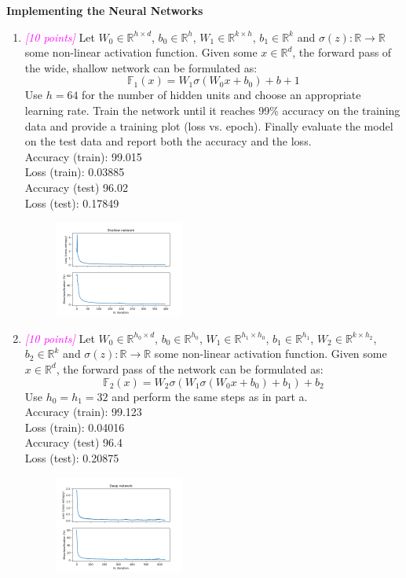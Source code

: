 \documentclass{article}
\newcommand{\field}[1]{\mathbb{#1}}
\newcommand{\1}{\mathbf{1}}
\newcommand{\R}{\field{R}} %
\newcommand{\F}{\field{F}} %
\newcommand{\points}[1]{\small\textcolor{magenta}{\emph{[#1 points]}} \normalsize}
\begin{document}
\textbf{Implementing the Neural Networks}
\begin{enumerate}
    \item \points{10} Let $W_0\in\R^{h\times d}$, $b_0\in\R^h$, $W_1\in\R^{k\times h}$, $b_1\in\R^k$ and $\sigma (z): \R \rightarrow \R$ some non-linear activation function. Given some $x\in\R^d$, the forward pass of the wide, shallow network can be formulated as:
    $$\F_1(x) = W_1\sigma (W_0x+b_0) + b+1$$
    Use $h=64$ for the number of hidden units and choose an appropriate learning rate. Train the network until it reaches 99\% accuracy on the training data and provide a training plot (loss vs. epoch). Finally evaluate the model on the test data and report both the accuracy and the loss. \\
    Accuracy (train): 99.015 \\
    Loss (train): 0.03885 \\
    Accuracy (test) 96.02 \\
    Loss (test): 0.17849 \\
    \begin{figure}[h!]
    \centering 
    \includegraphics[width=0.4\textwidth]{HW3/HW3_plots/A5a_ShallowNet.png}
    \end{figure}
    
    \newpage
    \item \points{10} Let $W_0\in\R^{h_0\times d}$, $b_0\in\R^{h_0}$, $W_1\in\R^{h_1\times h_0}$, $b_1 \in \R^{h_1}$, $W_2\in \R^{k\times h_2}$, $b_2 \in \R^k$ and $\sigma (z): \R \rightarrow \R$ some non-linear activation function. Given some $x\in\R^d$, the forward pass of the network can be formulated as:
    $$\F_2(x) = W_2\sigma(W_1\sigma (W_0x + b_0) +b_1) + b_2$$
    Use $h_0 = h_1= 32$ and perform the same steps as in part a.\\
    Accuracy (train): 99.123 \\
    Loss (train): 0.04016 \\
    Accuracy (test) 96.4 \\
    Loss (test): 0.20875 \\
    \begin{figure}[h!]
    \centering 
    \includegraphics[width=0.4\textwidth]{HW3/HW3_plots/A5b_DeepNet.png}
    \end{figure}
    

\end{enumerate}
\end{document}
